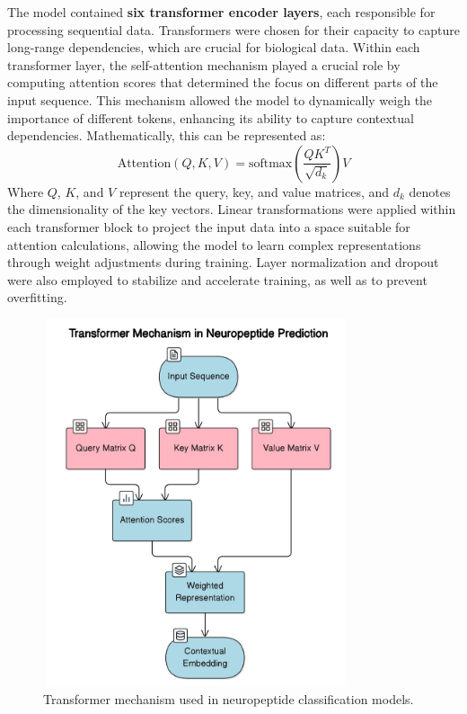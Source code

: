 \documentclass[conference]{IEEEtran}
\begin{document}
The model contained \textbf{six transformer encoder layers}, each responsible for processing sequential data. Transformers were chosen for their capacity to capture long-range dependencies, which are crucial for biological data. Within each transformer layer, the self-attention mechanism played a crucial role by computing attention scores that determined the focus on different parts of the input sequence. This mechanism allowed the model to dynamically weigh the importance of different tokens, enhancing its ability to capture contextual dependencies. Mathematically, this can be represented as:
\begin{equation}
\text{Attention}(Q, K, V) = \text{softmax}\left(\frac{QK^T}{\sqrt{d_k}}\right) V
\end{equation}
Where \(Q\), \(K\), and \(V\) represent the query, key, and value matrices, and \(d_k\) denotes the dimensionality of the key vectors. Linear transformations were applied within each transformer block to project the input data into a space suitable for attention calculations, allowing the model to learn complex representations through weight adjustments during training. Layer normalization and dropout were also employed to stabilize and accelerate training, as well as to prevent overfitting. 

\vspace{-1em}
\begin{figure}[h]
    \centering
    \includegraphics[height = 10.8cm, width=9cm]{Images/5.jpg}
    \vspace{-1.6em}
    \caption{Transformer mechanism used in neuropeptide classification models.}
    \label{fig:transformer-mechanism}
\end{figure}
\end{document}
